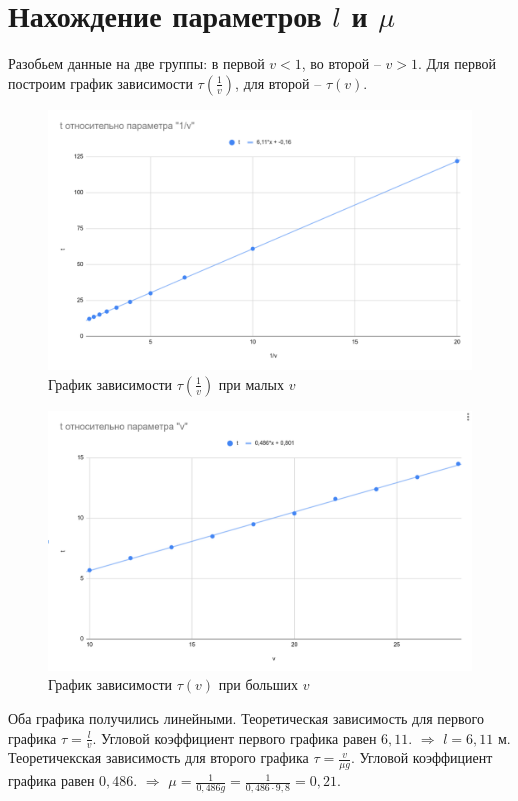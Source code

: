 \documentclass[12pt]{article}
\begin{document}
	\section{Нахождение параметров $l$ и $\mu$}
	Разобьем данные на две группы: в первой $v < 1$, во второй -- $v > 1$. Для первой построим график зависимости $\tau(\frac{1}{v})$, для второй -- $\tau(v)$.
	\begin{figure}[H]
		\centering
		\includegraphics[width=0.9\linewidth]{graph1}
		\caption{График зависимости $\tau(\frac{1}{v})$ при малых $v$}
	\end{figure}
	\begin{figure}[H]
		\centering
		\includegraphics[width=0.9\linewidth]{graph2}
		\caption{График зависимости $\tau(v)$ при больших $v$}
	\end{figure}
	Оба графика получились линейными. Теоретическая зависимость для первого графика $\displaystyle\tau = \frac{l}{v}$. Угловой коэффициент первого графика равен $6{,}11$. $\Rightarrow$ $l = 6{,}11$ м.\\
	Теоретичекская зависимость для второго графика $\displaystyle\tau = \frac{v}{\mu g}$. Угловой коэффициент графика равен $0{,}486$. $\Rightarrow$ $\displaystyle\mu = \frac{1}{0{,}486 g}=\frac{1}{0{,}486\cdot 9{,}8}=0,21$.
\end{document}
